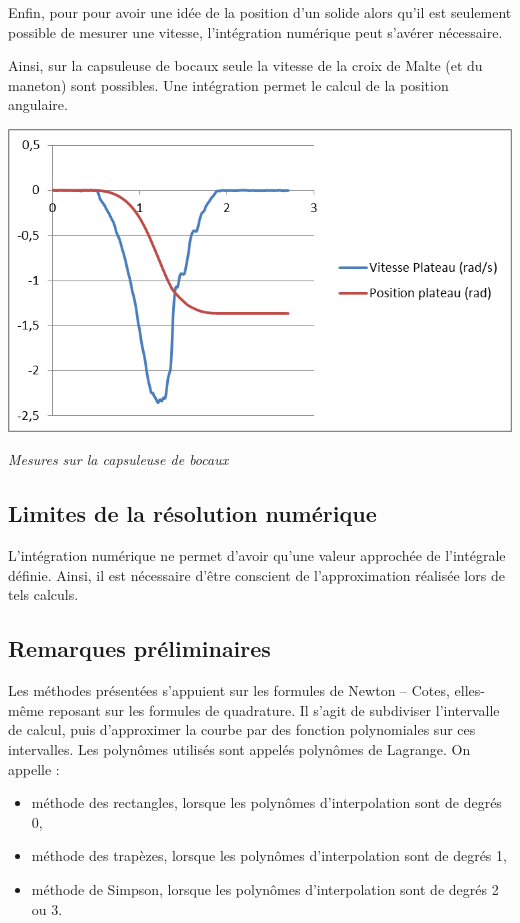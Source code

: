 \documentclass[10pt,fleqn]{article} %
\begin{document}
\begin{minipage}[c]{.47\linewidth}
Enfin, pour pour avoir une idée de la position d'un solide alors qu'il est seulement possible de mesurer une vitesse, l'intégration numérique peut s'avérer nécessaire.

Ainsi, sur la capsuleuse de bocaux seule la vitesse de la croix de Malte (et du maneton) sont possibles. Une intégration permet le calcul de la position angulaire.
\end{minipage}\hfill
\begin{minipage}[c]{.47\linewidth}
\begin{center}
\includegraphics[width=.95\textwidth]{images/capsuleuse}

\textit{Mesures sur la capsuleuse de bocaux}
\end{center}
\end{minipage}

\subsection{Limites de la résolution numérique}
\begin{warn}
L'intégration numérique ne permet d'avoir qu'une valeur approchée de l'intégrale définie. 
Ainsi, il est nécessaire d'être conscient de l'approximation réalisée lors de tels calculs.
\end{warn}

\subsection{Remarques préliminaires}

Les méthodes présentées s'appuient sur les formules de Newton -- Cotes, elles-même reposant sur les formules de quadrature. Il s'agit de subdiviser l'intervalle de calcul, puis d'approximer la courbe par des fonction polynomiales sur ces intervalles. Les polynômes utilisés sont appelés polynômes de Lagrange. On appelle :
\begin{itemize}
\item méthode des rectangles, lorsque les polynômes d'interpolation sont de degrés 0,
\item méthode des trapèzes, lorsque les polynômes d'interpolation sont de degrés 1,
\item méthode de Simpson, lorsque les polynômes d'interpolation sont de degrés 2 ou 3. 
\end{itemize}
\end{document}

